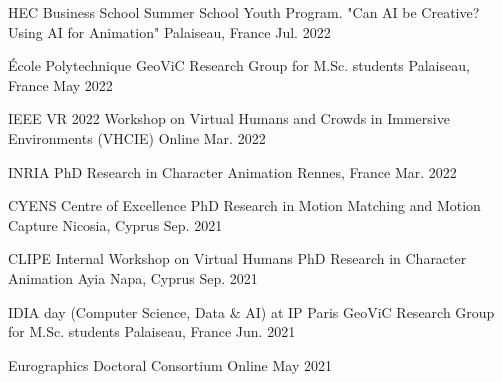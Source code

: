 

\begin{cventries}

\cvtalk
    {HEC Business School} %
    {Summer School Youth Program. "Can AI be Creative? Using AI for Animation"} %
    {Palaiseau, France} %
    {Jul. 2022} %

\cvtalk
    {École Polytechnique} %
    {GeoViC Research Group for M.Sc. students} %
    {Palaiseau, France} %
    {May 2022} %

\cvtalk
    {IEEE VR 2022} %
    {Workshop on Virtual Humans and Crowds in Immersive Environments (VHCIE)} %
    {Online} %
    {Mar. 2022} %

\cvtalk
    {INRIA} %
    {PhD Research in Character Animation} %
    {Rennes, France} %
    {Mar. 2022} %

\cvtalk
    {CYENS Centre of Excellence} %
    {PhD Research in Motion Matching and Motion Capture} %
    {Nicosia, Cyprus} %
    {Sep. 2021} %

\cvtalk
    {CLIPE Internal Workshop on Virtual Humans} %
    {PhD Research in Character Animation} %
    {Ayia Napa, Cyprus} %
    {Sep. 2021} %

\end{cventries}


\begin{cventries}

\cvtalk
    {IDIA day (Computer Science, Data \& AI) at IP Paris} %
    {GeoViC Research Group for M.Sc. students} %
    {Palaiseau, France} %
    {Jun. 2021} %

\cvtalk
    {Eurographics} %
    {Doctoral Consortium} %
    {Online} %
    {May 2021} %

\end{cventries}